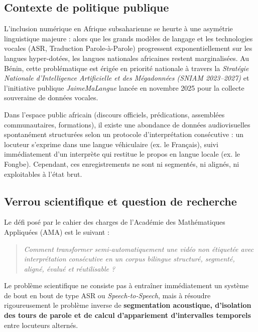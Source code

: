 \documentclass[10pt,a4paper,twocolumn]{article}
\begin{document}
\subsection{Contexte de politique publique}
L'inclusion numérique en Afrique subsaharienne se heurte à une asymétrie linguistique majeure : alors que les grands modèles de langage et les technologies vocales (ASR, Traduction Parole-à-Parole) progressent exponentiellement sur les langues hyper-dotées, les langues nationales africaines restent marginalisées. Au Bénin, cette problématique est érigée en priorité nationale à travers la \textit{Stratégie Nationale d'Intelligence Artificielle et des Mégadonnées (SNIAM 2023--2027)} et l'initiative publique \textit{JaimeMaLangue} lancée en novembre 2025 pour la collecte souveraine de données vocales. 

Dans l'espace public africain (discours officiels, prédications, assemblées communautaires, formations), il existe une abondance de données audiovisuelles spontanément structurées selon un protocole d'interprétation consécutive : un locuteur s'exprime dans une langue véhiculaire (ex. le Français), suivi immédiatement d'un interprète qui restitue le propos en langue locale (ex. le Fongbe). Cependant, ces enregistrements ne sont ni segmentés, ni alignés, ni exploitables à l'état brut.

\subsection{Verrou scientifique et question de recherche}
Le défi posé par le cahier des charges de l'Académie des Mathématiques Appliquées (AMA) est le suivant :
\begin{quote}
\textit{Comment transformer semi-automatiquement une vidéo non étiquetée avec interprétation consécutive en un corpus bilingue structuré, segmenté, aligné, évalué et réutilisable ?}
\end{quote}

Le problème scientifique ne consiste pas à entraîner immédiatement un système de bout en bout de type ASR ou \textit{Speech-to-Speech}, mais à résoudre rigoureusement le problème inverse de \textbf{segmentation acoustique, d'isolation des tours de parole et de calcul d'appariement d'intervalles temporels} entre locuteurs alternés.
\end{document}
